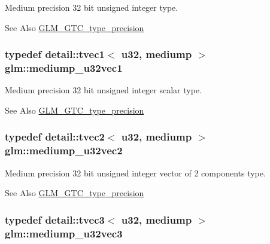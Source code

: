 Medium precision 32 bit unsigned integer type. \begin{DoxySeeAlso}{See Also}
\hyperlink{group__gtc__type__precision}{G\-L\-M\-\_\-\-G\-T\-C\-\_\-type\-\_\-precision} 
\end{DoxySeeAlso}
\hypertarget{group__gtc__type__precision_ga323fb0ed8f492d918b087226db2994f3}{
\subsubsection[{mediump\-\_\-u32vec1}]{\setlength{\rightskip}{0pt plus 5cm}typedef detail\-::tvec1$<$ u32, mediump $>$ {\bf glm\-::mediump\-\_\-u32vec1}}}\label{group__gtc__type__precision_ga323fb0ed8f492d918b087226db2994f3}
Medium precision 32 bit unsigned integer scalar type. \begin{DoxySeeAlso}{See Also}
\hyperlink{group__gtc__type__precision}{G\-L\-M\-\_\-\-G\-T\-C\-\_\-type\-\_\-precision} 
\end{DoxySeeAlso}
\hypertarget{group__gtc__type__precision_ga5d16ea7e110d8ba923ca347c16704f88}{
\subsubsection[{mediump\-\_\-u32vec2}]{\setlength{\rightskip}{0pt plus 5cm}typedef detail\-::tvec2$<$ u32, mediump $>$ {\bf glm\-::mediump\-\_\-u32vec2}}}\label{group__gtc__type__precision_ga5d16ea7e110d8ba923ca347c16704f88}
Medium precision 32 bit unsigned integer vector of 2 components type. \begin{DoxySeeAlso}{See Also}
\hyperlink{group__gtc__type__precision}{G\-L\-M\-\_\-\-G\-T\-C\-\_\-type\-\_\-precision} 
\end{DoxySeeAlso}
\hypertarget{group__gtc__type__precision_ga84a903ce8834b22f78d80a64eb0181bb}{
\subsubsection[{mediump\-\_\-u32vec3}]{\setlength{\rightskip}{0pt plus 5cm}typedef detail\-::tvec3$<$ u32, mediump $>$ {\bf glm\-::mediump\-\_\-u32vec3}}}\label{group__gtc__type__precision_ga84a903ce8834b22f78d80a64eb0181bb}
